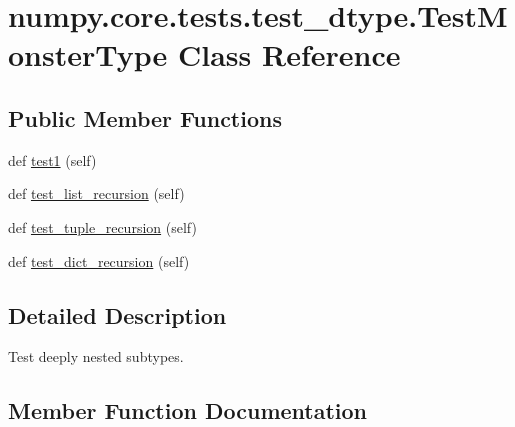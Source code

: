 \hypertarget{classnumpy_1_1core_1_1tests_1_1test__dtype_1_1TestMonsterType}{}\section{numpy.\+core.\+tests.\+test\+\_\+dtype.\+Test\+Monster\+Type Class Reference}
\label{classnumpy_1_1core_1_1tests_1_1test__dtype_1_1TestMonsterType}
\subsection*{Public Member Functions}
\begin{DoxyCompactItemize}
\item 
def \hyperlink{classnumpy_1_1core_1_1tests_1_1test__dtype_1_1TestMonsterType_afd848faf338b964987adbb12edbc7053}{test1} (self)
\item 
def \hyperlink{classnumpy_1_1core_1_1tests_1_1test__dtype_1_1TestMonsterType_a150a4ee76912214a6313f3d9bff78147}{test\+\_\+list\+\_\+recursion} (self)
\item 
def \hyperlink{classnumpy_1_1core_1_1tests_1_1test__dtype_1_1TestMonsterType_a980f884b5f0cc1eae2bbb0b7af1e9773}{test\+\_\+tuple\+\_\+recursion} (self)
\item 
def \hyperlink{classnumpy_1_1core_1_1tests_1_1test__dtype_1_1TestMonsterType_a061bd0ab4738447c957409d65af41f5d}{test\+\_\+dict\+\_\+recursion} (self)
\end{DoxyCompactItemize}


\subsection{Detailed Description}
\begin{DoxyVerb}Test deeply nested subtypes.\end{DoxyVerb}
 

\subsection{Member Function Documentation}
\mbox{\label{classnumpy_1_1core_1_1tests_1_1test__dtype_1_1TestMonsterType_afd848faf338b964987adbb12edbc7053}} 
